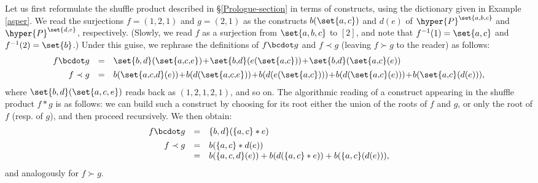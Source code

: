  Let us first reformulate the shuffle product described in  \S\ref{Prologue-section} in terms of constructs, using the dictionary given in Example \ref{asper}. We read the surjections
$f=(1,2,1)$ and $g=(2,1)$ as the constructs $b(\set{a,c})$ and $d(e)$ of $\hyper{P}^{\set{a,b,c}}$ and $\hyper{P}^{\set{d,e}}$, respectively. (Slowly, we read $f$ as a surjection from $\set{a,b,c}$ to $[2]$, and note that $f^{-1}(1)=\set{a,c}$ and $f^{-1}(2)=\set{b}$.) Under this guise, we  rephrase the definitions of $f\bcdot g$ and $f\prec g$ (leaving  $f\succ g$ to the reader)  as follows:
{\small{$$\begin{array}{rcl}
f\bcdot g &= &   \set{b,d}(\set{a,\!c,\!e })\! + \!\set{b,\!d}(e(\set{a,\!c}))\! + \!\set{b,\!d}(\set{a,\!c}(e))\\[0.15cm]
f\prec g & =&   b(\set{a,\!c,\!d}(e))\! +\! b(d(\set{a,\!c,\!e}))\!+ \! b(d(e(\set{a,\!c})))\! +\! b(d(\set{a,\!c}(e))) \!+ \! b(\set{a,\!c}(d(e))),
\end{array}$$}}
where $\set{b,d}(\set{a,c,e })$ reads back as  $(1,2,1,2,1)$, and so on. The algorithmic reading of a construct appearing in the shuffle product $f\ast g$ is as follows: we can build such a construct by choosing for its root either the union of the roots of  $f$ and $g$,  or only the root of $f$ (resp. of $g$),  and  then proceed recursively. We then obtain: 
$$\begin{array}{rcl}
f\bcdot g &= &   \{b,d\}(\{a,c\}\ast e)\\[0.15cm]
f\prec g & =&   b(\{a,c\}\ast d(e)) \\
&= &b(\{a,c,d\}(e))+b(d(\{a,c\}\ast e))+b(\{a,c\}(d(e))),
\end{array}$$ 
and analogously for $f\succ g$.

